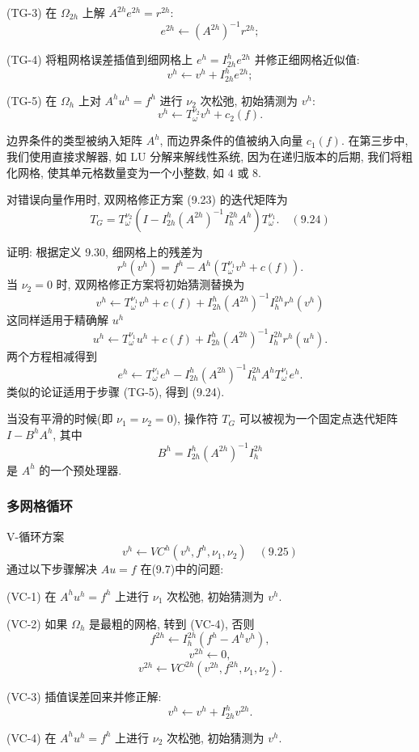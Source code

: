 \documentclass[a4paper]{ctexart}
\newcommand{\hl}[1]
{\noindent {\bf {#1}}}
\begin{document}
{(TG-3) 在 $\Omega_{2h}$ 上解 $A^{2h}e^{2h} = r^{2h}$: 
$$
e^{2h} \leftarrow (A^{2h})^{-1}r^{2h};
$$

(TG-4) 将粗网格误差插值到细网格上 $e^h = I^h_{2h}e^{2h}$ 
并修正细网格近似值:
$$ 
v^h \leftarrow v^h + I^h_{2h}e^{2h};
$$

(TG-5) 在 $\Omega_h$ 上对 $A^hu^h = f^h$ 进行 $\nu_2$ 次松弛, 
初始猜测为 $v^h$:
$$
v^h \leftarrow T^{\nu_2}_\omega v^h + c_2(f).
$$

边界条件的类型被纳入矩阵 $A^h$, 而边界条件的值被纳入向量 
$c_1(f)$. 在第三步中, 我们使用直接求解器, 如 LU 分解来解线性系统, 
因为在递归版本的后期, 我们将粗化网格, 使其单元格数量变为一个小整数, 如 $4$ 或 $8$.

\hl{引理 9.31} 对错误向量作用时, 双网格修正方案 (9.23) 的迭代矩阵为
$$
T_G = T^{\nu_2}_\omega \left( I - I^h_{2h}(A^{2h})^{-1}I^{2h}_h A^h \right) 
T^{\nu_1}_\omega. \quad (9.24) 
$$

证明: 根据定义 9.30, 细网格上的残差为
$$
r^h(v^h) = f^h - A^h \left( T^{\nu_1}_\omega v^h + c(f) \right). 
$$
当 $\nu_2 = 0$ 时, 双网格修正方案将初始猜测替换为
$$
v^h \leftarrow T^{\nu_1}_\omega v^h 
+ c(f) + I^h_{2h}(A^{2h})^{-1}I^{2h}_h r^h(v^h) 
$$
这同样适用于精确解 $u^h$
$$
u^h \leftarrow T^{\nu_1}_\omega u^h 
+ c(f) + I^h_{2h}(A^{2h})^{-1}I^{2h}_h r^h(u^h). 
$$
两个方程相减得到
$$
e^h \leftarrow T^{\nu_1}_\omega e^h 
- I^h_{2h}(A^{2h})^{-1}I^{2h}_h A^h T^{\nu_1}_\omega e^h. 
$$
类似的论证适用于步骤 (TG-5), 得到 (9.24).

当没有平滑的时候(即 $\nu_1 = \nu_2 = 0$), 
操作符 $T_G$ 可以被视为一个固定点迭代矩阵 $I - B^hA^h$, 
其中 
$$
B^h = I^h_{2h}(A^{2h})^{-1}I^{2h}_h
$$ 
是 $A^h$ 的一个预处理器.

\subsubsection{多网格循环}

\hl{定义 9.32} V-循环方案
$$
v^h \leftarrow VC^h(v^h,f^h, \nu_1, \nu_2) \quad (9.25) 
$$
通过以下步骤解决 $Au = f$ 在(9.7)中的问题:

(VC-1) 在 $A^h u^h = f^h$ 上进行 $\nu_1$ 次松弛, 初始猜测为 $v^h$.

(VC-2) 如果 $\Omega_h$ 是最粗的网格, 转到 (VC-4), 否则
$$
f^{2h} \leftarrow I^{2h}_h(f^h - A^hv^h), 
$$
$$
v^{2h} \leftarrow 0, 
$$
$$
v^{2h} \leftarrow VC^{2h}(v^{2h},f^{2h}, \nu_1, \nu_2). 
$$

(VC-3) 插值误差回来并修正解:
$$
v^h \leftarrow v^h + I^h_{2h}v^{2h}. 
$$

(VC-4) 在 $A^h u^h = f^h$ 上进行 $\nu_2$ 次松弛, 初始猜测为 $v^h$.

}
\end{document}
